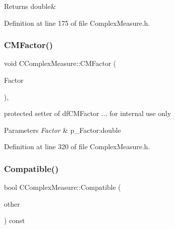 \begin{DoxyReturn}{Returns}
double\& 
\end{DoxyReturn}


Definition at line 175 of file Complex\+Measure.\+h.

\mbox{\label{classCComplexMeasure_abc97b2ed29224bb00a912a94933192a2}} 
\subsubsection{\texorpdfstring{C\+M\+Factor()}{CMFactor()}\hspace{0.1cm}{\footnotesize\ttfamily [2/2]}}
{\footnotesize\ttfamily void C\+Complex\+Measure\+::\+C\+M\+Factor (\begin{DoxyParamCaption}\item[{const double}]{Factor }\end{DoxyParamCaption})\hspace{0.3cm}{\ttfamily [inline]}, {\ttfamily [protected]}}



protected setter of df\+C\+M\+Factor ... for internal use only 


\begin{DoxyParams}{Parameters}
{\em Factor} & p\+\_\+\+Factor\+:double \\
\hline
\end{DoxyParams}


Definition at line 320 of file Complex\+Measure.\+h.

\mbox{\label{classCComplexMeasure_aa807816cc8d410ff08e482c5e942a1a9}} 
\subsubsection{\texorpdfstring{Compatible()}{Compatible()}}
{\footnotesize\ttfamily bool C\+Complex\+Measure\+::\+Compatible (\begin{DoxyParamCaption}\item[{const \hyperlink{classCComplexMeasure}{C\+Complex\+Measure} \&}]{other }\end{DoxyParamCaption}) const}



